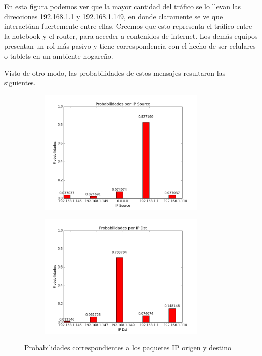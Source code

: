 En esta figura podemos ver que la mayor cantidad del tr\'afico se lo llevan las direcciones 192.168.1.1 y 192.168.1.149, en donde claramente se ve que interact\'uan fuertemente entre ellas. Creemos que esto representa el tr\'afico entre la notebook y el router, para acceder a contenidos de internet. Los dem\'as equipos presentan un rol m\'as pasivo y tiene correspondencia con el hecho de ser celulares o tablets en un ambiente hogare\~no.\newline

Visto de otro modo, las probabilidades de estos mensajes resultaron las siguientes.

\begin{figure}[H]

\begin{subfigure}{0.6\textwidth}
\includegraphics[width=0.9\linewidth, height=6cm]{imagenes/exp1/6probabilidadIPSource} 
\caption{}
\end{subfigure}
\begin{subfigure}{0.6\textwidth}
\includegraphics[width=0.9\linewidth, height=6cm]{imagenes/exp1/7probabilidadIPDst}
\caption{}
\end{subfigure}

\caption{Probabilidades correspondientes a los paquetes IP origen y destino}
\label{fig:1}
\end{figure}


